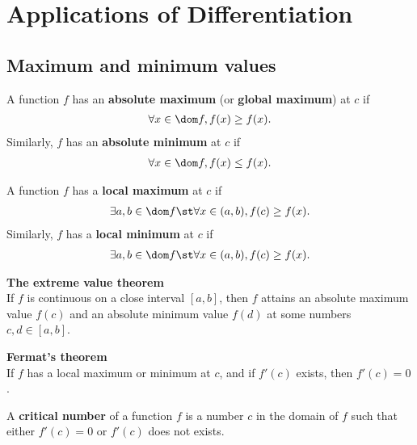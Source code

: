 \documentclass{article}
\begin{document}
\section{Applications of Differentiation}
\subsection{Maximum and minimum values}
\begin{definition}
    A function $f$ has an \textbf{absolute maximum} (or \textbf{global maximum}) at $c$ if
    \begin{align*}
        \forall x\in \dom f, f(x)\geq f(x).
    \end{align*}
    Similarly, $f$ has an \textbf{absolute minimum} at $c$ if
    \begin{align*}
        \forall x\in \dom f, f(x)\leq f(x).
    \end{align*}
\end{definition}
\begin{definition}
    A function $f$ has a \textbf{local maximum} at $c$ if
    \begin{align*}
        \exists a,b\in \dom f \st \forall x\in (a,b), f(c)\geq f(x).
    \end{align*}
    Similarly, $f$ has a \textbf{local minimum} at $c$ if
    \begin{align*}
        \exists a,b\in \dom f\st \forall x\in(a,b), f(c)\geq f(x).
    \end{align*}
\end{definition}
\begin{theorem}
    \textbf{The extreme value theorem}\\
    If $f$ is continuous on a close interval $[a,b]$, then $f$ attains an absolute maximum value $f(c)$ and an absolute minimum value $f(d)$ at some numbers $c,d\in[a,b]$.
\end{theorem}
\begin{theorem}
    \textbf{Fermat's theorem}\\
    If $f$ has a local maximum or minimum at $c$, and if $f'(c)$ exists, then $f'(c)=0$.
\end{theorem}
\begin{definition}
    A \textbf{critical number} of a function $f$ is a number $c$ in the domain of $f$ such that either $f'(c)=0$ or $f'(c)$ does not exists.
\end{definition}
\end{document}
